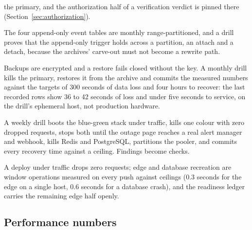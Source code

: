 \begin{description}
    the primary, and the authorization half of a verification verdict is pinned there
    (Section~\ref{sec:authorization}). \sImpl
  \item[Partitioning.] The four append-only event tables are monthly range-partitioned, and a
    drill proves that the append-only trigger holds across a partition, an attach and a detach,
    because the archives' carve-out must not become a rewrite path. \sImpl
  \item[Disaster recovery.] Backups are encrypted and a restore fails closed without the key.
    A monthly drill kills the primary, restores it from the archive and commits the measured numbers
    against the targets of 300 seconds of data loss and four hours to recover: the last recorded
    rows show 36 to 42 seconds of loss and under five seconds to service, on the drill's ephemeral
    host, not production hardware. \sImpl
  \item[Chaos.] A weekly drill boots the blue-green stack under traffic, kills one colour with zero
    dropped requests, stops both until the outage page reaches a real alert manager and webhook,
    kills Redis and PostgreSQL, partitions the pooler, and commits every recovery time against a
    ceiling. Findings become checks. \sImpl
  \item[Rolling deploys.] A deploy under traffic drops zero requests; edge and database recreation
    are window operations measured on every push against ceilings (0.3 seconds for the edge on a
    single host, 0.6 seconds for a database crash), and the readiness ledger carries the remaining
    edge half openly. \sImpl
\end{description}

\subsection*{Performance numbers}

